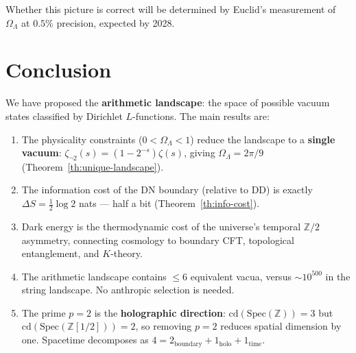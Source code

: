 \documentclass[11pt,a4paper]{article}
\begin{document}
Whether this picture is correct will be determined by Euclid's
measurement of $\Omega_\Lambda$ at $0.5\%$ precision, expected
by 2028.

\section{Conclusion}

We have proposed the \textbf{arithmetic landscape}: the space of
possible vacuum states classified by Dirichlet $L$-functions.
The main results are:

\begin{enumerate}
\item The physicality constraints ($0 < \Omega_\Lambda < 1$)
reduce the landscape to a \textbf{single vacuum}:
$\zeta_{\neg 2}(s) = (1-2^{-s})\zeta(s)$, giving
$\Omega_\Lambda = 2\pi/9$ (Theorem~\ref{th:unique-landscape}).

\item The information cost of the DN boundary (relative to DD)
is exactly $\Delta S = \frac{1}{2}\log 2$ nats --- half a bit
(Theorem~\ref{th:info-cost}).

\item Dark energy is the thermodynamic cost of the universe's
temporal $\mathbb{Z}/2$ asymmetry, connecting cosmology to
boundary CFT, topological entanglement, and $K$-theory.

\item The arithmetic landscape contains $\leq 6$ equivalent vacua,
versus $\sim 10^{500}$ in the string landscape. No anthropic
selection is needed.

\item The prime $p = 2$ is the \textbf{holographic direction}:
$\mathrm{cd}(\mathrm{Spec}(\mathbb{Z})) = 3$ but
$\mathrm{cd}(\mathrm{Spec}(\mathbb{Z}[1/2])) = 2$, so removing
$p = 2$ reduces spatial dimension by one. Spacetime decomposes as
$4 = 2_{\text{boundary}} + 1_{\text{holo}} + 1_{\text{time}}$.
\end{enumerate}
\end{document}

